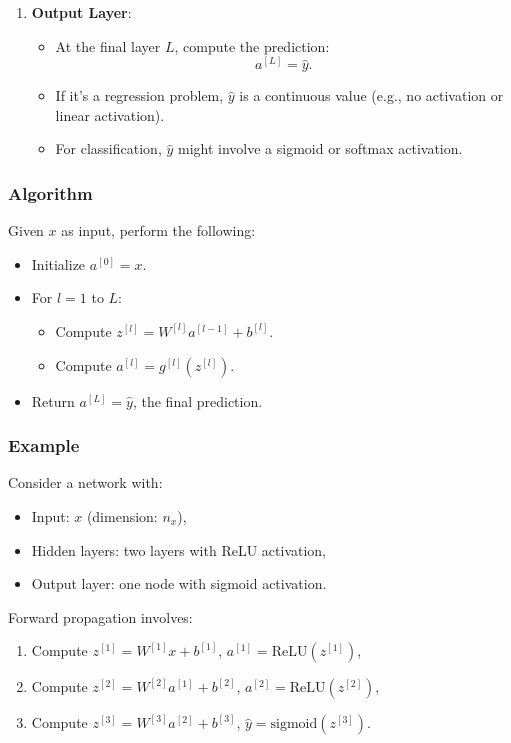 \documentclass[letterpaper,12pt,notitlepage,twoside]{report}
\begin{document}
\begin{enumerate}
    \item \textbf{Output Layer}:
    \begin{itemize}
        \item At the final layer \( L \), compute the prediction:
        \[
        a^{[L]} = \hat{y}.
        \]
        \item If it's a regression problem, \( \hat{y} \) is a continuous value (e.g., no activation or linear activation).
        \item For classification, \( \hat{y} \) might involve a sigmoid or softmax activation.
    \end{itemize}
\end{enumerate}

\subsubsection*{Algorithm}

Given \( x \) as input, perform the following:
\begin{itemize}
    \item Initialize \( a^{[0]} = x \).
    \item For \( l = 1 \) to \( L \):
    \begin{itemize}
        \item Compute \( z^{[l]} = W^{[l]} a^{[l-1]} + b^{[l]} \).
        \item Compute \( a^{[l]} = g^{[l]}(z^{[l]}) \).
    \end{itemize}
    \item Return \( a^{[L]} = \hat{y} \), the final prediction.
\end{itemize}

\subsubsection*{Example}

Consider a network with:
\begin{itemize}
    \item Input: \( x \) (dimension: \( n_x \)),
    \item Hidden layers: two layers with ReLU activation,
    \item Output layer: one node with sigmoid activation.
\end{itemize}

Forward propagation involves:
\begin{enumerate}
    \item Compute \( z^{[1]} = W^{[1]} x + b^{[1]} \), \( a^{[1]} = \text{ReLU}(z^{[1]}) \),
    \item Compute \( z^{[2]} = W^{[2]} a^{[1]} + b^{[2]} \), \( a^{[2]} = \text{ReLU}(z^{[2]}) \),
    \item Compute \( z^{[3]} = W^{[3]} a^{[2]} + b^{[3]} \), \( \hat{y} = \text{sigmoid}(z^{[3]}) \).
\end{enumerate}
\end{document}
